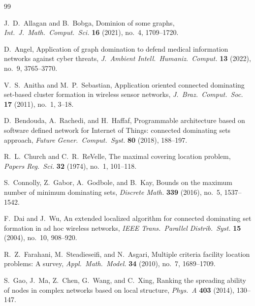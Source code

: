 \documentclass[11pt]{article}
\theoremstyle{definition}
\theoremstyle{remark}
\begin{document}

\begin{thebibliography}{99}

J.~D.~Allagan and B.~Bobga,
Dominion of some graphs,
\emph{Int.~J.~Math.~Comput.~Sci.} \textbf{16} (2021), no.~4, 1709--1720.

D.~Angel,
Application of graph domination to defend medical information networks against cyber threats,
\emph{J.~Ambient Intell.~Humaniz.~Comput.} \textbf{13} (2022), no.~9, 3765--3770.

V.~S.~Anitha and M.~P.~Sebastian,
Application oriented connected dominating set-based cluster formation in wireless sensor networks,
\emph{J.~Braz.~Comput.~Soc.} \textbf{17} (2011), no.~1, 3--18.

D.~Bendouda, A.~Rachedi, and H.~Haffaf,
Programmable architecture based on software defined network for Internet of Things: 
connected dominating sets approach,
\emph{Future Gener.~Comput.~Syst.} \textbf{80} (2018), 188--197.

R.~L.~Church and C.~R.~ReVelle,
The maximal covering location problem,
\emph{Papers Reg.~Sci.} \textbf{32} (1974), no.~1, 101--118.

S.~Connolly, Z.~Gabor, A.~Godbole, and B.~Kay,
Bounds on the maximum number of minimum dominating sets,
\emph{Discrete Math.} \textbf{339} (2016), no.~5, 1537--1542.

F.~Dai and J.~Wu,
An extended localized algorithm for connected dominating set formation in ad hoc wireless networks,
\emph{IEEE Trans.~Parallel Distrib.~Syst.} \textbf{15} (2004), no.~10, 908--920.

R.~Z.~Farahani, M.~Steadieseifi, and N.~Asgari,
Multiple criteria facility location problems: A survey,
\emph{Appl.~Math.~Model.} \textbf{34} (2010), no.~7, 1689--1709.

S.~Gao, J.~Ma, Z.~Chen, G.~Wang, and C.~Xing,
Ranking the spreading ability of nodes in complex networks based on local structure,
\emph{Phys.~A} \textbf{403} (2014), 130--147.


\end{thebibliography}
\end{document}

